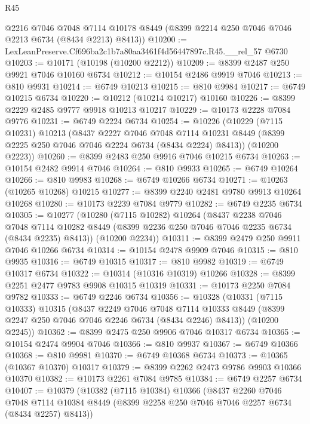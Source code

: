 \begin{lexlean}{R45}
\begin{coremodule}
{      @2216
      @7046
      @7048
      @7114
      @10178
      @8449
      (@8399 @2214 @250 @7046 @7046 @2213 @6734 (@8434 @2213) @8413))
@10200 := LexLeanPreserve.Cf696ba2c1b7a80aa3461f4d56447897c.R45.__rel_57 @6730
@10203 := @10171 (@10198 (@10200 @2212))
@10209 := @8399 @2487 @250 @9921 @7046 @10160 @6734
@10212 := @10154 @2486 @9919 @7046
@10213 := @810 @9931
@10214 := @6749 @10213
@10215 := @810 @9984
@10217 := @6749 @10215 @6734
@10220 := @10212 (@10214 @10217) @10160
@10226 := @8399 @2229 @2485 @9777 @9918 @10213 @10217
@10229 := @10173 @2228 @7084 @9776
@10231 := @6749 @2224 @6734
@10254 := @10226
    (@10229
      (@7115 @10231)
      @10213
      (@8437
        @2227
        @7046
        @7048
        @7114
        @10231
        @8449
        (@8399 @2225 @250 @7046 @7046 @2224 @6734 (@8434 @2224) @8413))
      (@10200 @2223))
@10260 := @8399 @2483 @250 @9916 @7046 @10215 @6734
@10263 := @10154 @2482 @9914 @7046
@10264 := @810 @9933
@10265 := @6749 @10264
@10266 := @810 @9983
@10268 := @6749 @10266 @6734
@10271 := @10263 (@10265 @10268) @10215
@10277 := @8399 @2240 @2481 @9780 @9913 @10264 @10268
@10280 := @10173 @2239 @7084 @9779
@10282 := @6749 @2235 @6734
@10305 := @10277
    (@10280
      (@7115 @10282)
      @10264
      (@8437
        @2238
        @7046
        @7048
        @7114
        @10282
        @8449
        (@8399 @2236 @250 @7046 @7046 @2235 @6734 (@8434 @2235) @8413))
      (@10200 @2234))
@10311 := @8399 @2479 @250 @9911 @7046 @10266 @6734
@10314 := @10154 @2478 @9909 @7046
@10315 := @810 @9935
@10316 := @6749 @10315
@10317 := @810 @9982
@10319 := @6749 @10317 @6734
@10322 := @10314 (@10316 @10319) @10266
@10328 := @8399 @2251 @2477 @9783 @9908 @10315 @10319
@10331 := @10173 @2250 @7084 @9782
@10333 := @6749 @2246 @6734
@10356 := @10328
    (@10331
      (@7115 @10333)
      @10315
      (@8437
        @2249
        @7046
        @7048
        @7114
        @10333
        @8449
        (@8399 @2247 @250 @7046 @7046 @2246 @6734 (@8434 @2246) @8413))
      (@10200 @2245))
@10362 := @8399 @2475 @250 @9906 @7046 @10317 @6734
@10365 := @10154 @2474 @9904 @7046
@10366 := @810 @9937
@10367 := @6749 @10366
@10368 := @810 @9981
@10370 := @6749 @10368 @6734
@10373 := @10365 (@10367 @10370) @10317
@10379 := @8399 @2262 @2473 @9786 @9903 @10366 @10370
@10382 := @10173 @2261 @7084 @9785
@10384 := @6749 @2257 @6734
@10407 := @10379
    (@10382
      (@7115 @10384)
      @10366
      (@8437
        @2260
        @7046
        @7048
        @7114
        @10384
        @8449
        (@8399 @2258 @250 @7046 @7046 @2257 @6734 (@8434 @2257) @8413))
}
\end{coremodule}
\end{lexlean}
